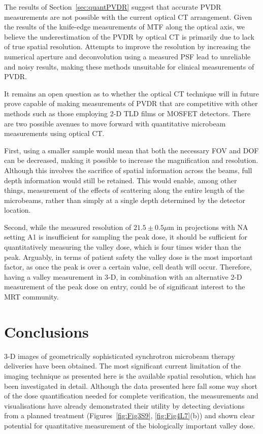 	
	The results of Section~\ref{sec:quantPVDR} suggest that accurate PVDR measurements are not possible with the current optical CT arrangement. Given the results of the knife-edge measurements of MTF along the optical axis, we believe the underestimation of the PVDR by optical CT is primarily due to lack of true spatial resolution. Attempts to improve the resolution by increasing the numerical aperture and deconvolution using a measured PSF lead to unreliable and noisy results, making these methods unsuitable for clinical measurements of PVDR.   
	
	It remains an open question as to whether the optical CT technique will in future prove capable of making measurements of PVDR that are competitive with other methods such as those employing 2-D TLD films or MOSFET detectors. There are two possible avenues to move forward with quantitative microbeam measurements using optical CT. 
	
	First, using a smaller sample would mean that both the necessary FOV and DOF can be decreased, making it possible to increase the magnification and resolution. Although this involves the sacrifice of spatial information across the beams, full depth information would still be retained. This would enable, among other things, measurement of the effects of scattering along the entire length of the microbeams, rather than simply at a single depth determined by the detector location. 
	
	Second, while the measured resolution of $21.5 \pm 0.5 \mu$m in projections with NA setting A1 is insufficient for sampling the peak dose, it should be sufficient for quantitatively measuring the valley dose, which is four times wider than the peak. Arguably, in terms of patient safety the valley dose is the most important factor, as once the peak is over a certain value, cell death will occur. Therefore, having a valley measurement in 3-D, in combination with an alternative 2-D measurement of the peak dose on entry, could be of significant interest to the MRT community.
	
	\section{Conclusions}
	3-D images of geometrically sophisticated synchrotron microbeam therapy deliveries have been obtained. The most significant current limitation of the imaging technique as presented here is the available spatial resolution, which has been investigated in detail. Although the data presented here fall some way short of the dose quantification needed for complete verification, the measurements and visualisations have already demonstrated their utility by detecting deviations from a planned treatment (Figures~\ref{fig:Fig3S9}, \ref{fig:Fig4L7}(b)) and shown clear potential for quantitative measurement of the biologically important valley dose.
	
	
	
	
	
